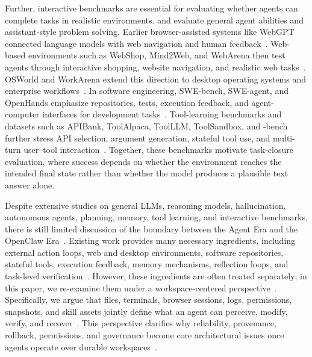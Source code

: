 Further, interactive benchmarks are essential for evaluating whether agents can complete tasks in realistic environments. \citet{liu2023agentbench} and \citet{mialon2023gaia} evaluate general agent abilities and assistant-style problem solving. Earlier browser-assisted systems like WebGPT connected language models with web navigation and human feedback~\citep{nakano2022webgpt}. Web-based environments such as WebShop, Mind2Web, and WebArena then test agents through interactive shopping, website navigation, and realistic web tasks~\citep{yao2022webshop,deng2023mind2web,zhou2023webarena}. OSWorld and WorkArena extend this direction to desktop operating systems and enterprise workflows~\citep{xie2024osworld,drouin2024workarena}. In software engineering, SWE-bench, SWE-agent, and OpenHands emphasize repositories, tests, execution feedback, and agent-computer interfaces for development tasks~\citep{jimenez2023swebench,yang2024sweagent,wang2024openhands}. Tool-learning benchmarks and datasets such as APIBank, ToolAlpaca, ToolLLM, ToolSandbox, and 
-bench further stress API selection, argument generation, stateful tool use, and multi-turn user--tool interaction~\citep{li2023apibank,tang2023toolalpaca,qin2023toolllm,lu2024toolsandbox,yao2024taubench}. Together, these benchmarks motivate task-closure evaluation, where success depends on whether the environment reaches the intended final state rather than whether the model produces a plausible text answer alone.

Despite extensive studies on general LLMs, reasoning models, hallucination, autonomous agents, planning, memory, tool learning, and interactive benchmarks, there is still limited discussion of the boundary between the Agent Era and the OpenClaw Era~\citep{dong2024survey,huang2024understanding,yehudai2025survey,mamun2026anatomical}. Existing work provides many necessary ingredients, including external action loops, web and desktop environments, software repositories, stateful tools, execution feedback, memory mechanisms, reflection loops, and task-level verification~\citep{wei2025plangenllms,Rawles2024AndroidWorldAD,Bonatti2024WindowsAA,Kapoor2024OmniACTAD,Xu2024TheAgentCompanyBL,Merrill2026TerminalBenchBA,Boisvert2024WorkArenaTC}. However, these ingredients are often treated separately; in this paper, we re-examine them under a workspace-centered perspective~\citep{drouin2024workarena,chezelles2024browsergym,wang2024openhands,Boisvert2024WorkArenaTC,Xu2024TheAgentCompanyBL}. Specifically, we argue that files, terminals, browser sessions, logs, permissions, snapshots, and skill assets jointly define what an agent can perceive, modify, verify, and recover~\citep{Rawles2024AndroidWorldAD,Bonatti2024WindowsAA,Kapoor2024OmniACTAD,Merrill2026TerminalBenchBA}. This perspective clarifies why reliability, provenance, rollback, permissions, and governance become core architectural issues once agents operate over durable workspaces~\citep{zhao2026clawguard,ge2026governance}.

